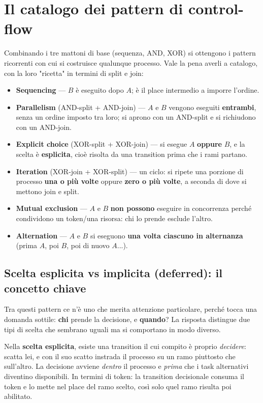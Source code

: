 \section{\texorpdfstring{Il catalogo dei pattern di control-flow}{Il catalogo dei pattern di control-flow}}

Combinando i tre mattoni di base (sequenza, AND, XOR) si ottengono i pattern ricorrenti con cui si costruisce qualunque processo. Vale la pena averli a catalogo, con la loro "ricetta" in termini di split e join:

\begin{itemize}
\item \textbf{Sequencing} — $B$ è eseguito dopo $A$; è il place intermedio a imporre l'ordine.
\item \textbf{Parallelism} (AND-split + AND-join) — $A$ e $B$ vengono eseguiti \textbf{entrambi}, senza un ordine imposto tra loro; si aprono con un AND-split e si richiudono con un AND-join.
\item \textbf{Explicit choice} (XOR-split + XOR-join) — si esegue $A$ \textbf{oppure} $B$, e la scelta è \textbf{esplicita}, cioè risolta da una transition prima che i rami partano.
\item \textbf{Iteration} (XOR-join + XOR-split) — un ciclo: si ripete una porzione di processo \textbf{una o più volte} oppure \textbf{zero o più volte}, a seconda di dove si mettono join e split.
\item \textbf{Mutual exclusion} — $A$ e $B$ \textbf{non possono} eseguire in concorrenza perché condividono un token/una risorsa: chi lo prende esclude l'altro.
\item \textbf{Alternation} — $A$ e $B$ si eseguono \textbf{una volta ciascuno in alternanza} (prima $A$, poi $B$, poi di nuovo $A$...).
\end{itemize}

\subsection{\texorpdfstring{Scelta esplicita vs implicita (deferred): il concetto chiave}{Scelta esplicita vs implicita (deferred): il concetto chiave}}

Tra questi pattern ce n'è uno che merita attenzione particolare, perché tocca una domanda sottile: \textbf{chi} prende la decisione, e \textbf{quando}? La risposta distingue due tipi di scelta che sembrano uguali ma si comportano in modo diverso.

Nella \textbf{scelta esplicita}, esiste una transition il cui compito è proprio \emph{decidere}: scatta lei, e con il suo scatto instrada il processo su un ramo piuttosto che sull'altro. La decisione avviene \emph{dentro} il processo e \emph{prima} che i task alternativi diventino disponibili. In termini di token: la transition decisionale consuma il token e lo mette nel place del ramo scelto, così solo quel ramo risulta poi abilitato.

